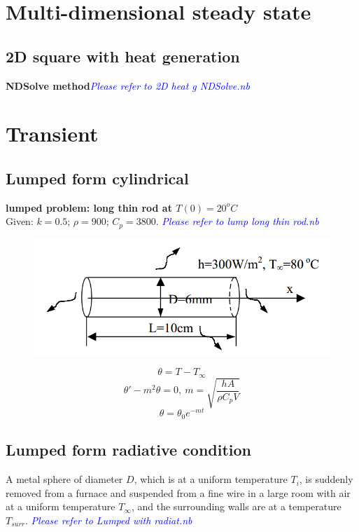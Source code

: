 \begin{appendices}
\section{Multi-dimensional steady state}
\subsection{2D square with heat generation}
\begin{example}
\textbf{NDSolve method}\textcolor{blue} {\emph{Please refer to 2D heat g NDSolve.nb}}
\end{example}

\section{Transient}
\subsection{Lumped form cylindrical}
\begin{example}
\textbf{lumped problem: long thin rod at $T(0)=20^oC$}\\
Given: $k = 0.5$; $\rho= 900$; $C_p = 3800$.
\textcolor{blue} {\emph{Please refer to lump long thin rod.nb}}
\begin{figure}[H]
  \centering
    \includegraphics[scale=0.5]{figures/appendixA/4}
\end{figure}
$$\theta=T-T_\infty$$
$$\theta'-m^2\theta=0,~m=\sqrt{\frac{hA}{\rho C_pV}}$$
$$\theta=\theta_0e^{-mt}$$
\end{example}
\subsection{Lumped form radiative condition}
\begin{example}
A metal sphere of diameter $D$, which is at a uniform temperature $T_i$, is suddenly removed from a furnace and suspended from a fine wire in a large room with air at a uniform temperature $T_\infty$, and the surrounding walls are at a temperature $T_{surr}$.  
\textcolor{blue} {\emph{Please refer to Lumped with radiat.nb}}
\end{example}

\end{appendices}
